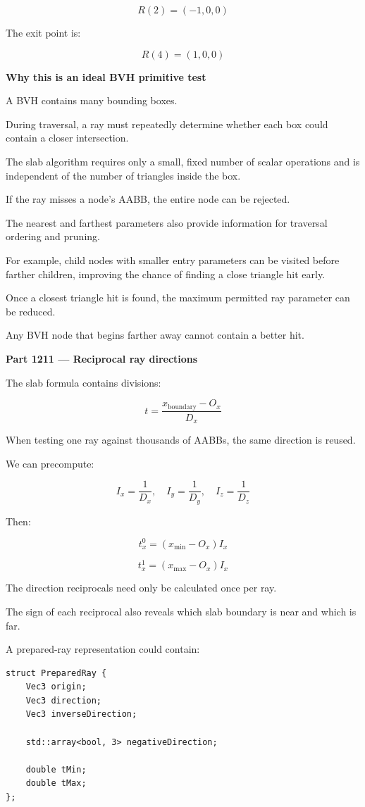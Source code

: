 \[
R(2)=(-1,0,0)
\]

The exit point is:

\[
R(4)=(1,0,0)
\]

\textbf{Why this is an ideal BVH primitive test}

A BVH contains many bounding boxes.

During traversal, a ray must repeatedly determine whether each box could contain a closer intersection.

The slab algorithm requires only a small, fixed number of scalar operations and is independent of the number of triangles inside the box.

If the ray misses a node's AABB, the entire node can be rejected.

The nearest and farthest parameters also provide information for traversal ordering and pruning.

For example, child nodes with smaller entry parameters can be visited before farther children, improving the chance of finding a close triangle hit early.

Once a closest triangle hit is found, the maximum permitted ray parameter can be reduced.

Any BVH node that begins farther away cannot contain a better hit.

\textbf{Part 1211 --- Reciprocal ray directions}

The slab formula contains divisions:

\[
t=\frac{x_{\mathrm{boundary}}-O_x}{D_x}
\]

When testing one ray against thousands of AABBs, the same direction is reused.

We can precompute:

\[
\boxed{ I_x=\frac1{D_x},\quad I_y=\frac1{D_y},\quad I_z=\frac1{D_z} }
\]

Then:

\[
t_x^0=(x_{\min}-O_x)I_x
\]

\[
t_x^1=(x_{\max}-O_x)I_x
\]

The direction reciprocals need only be calculated once per ray.

The sign of each reciprocal also reveals which slab boundary is near and which is far.

A prepared-ray representation could contain:

\begin{verbatim}
struct PreparedRay {
    Vec3 origin;
    Vec3 direction;
    Vec3 inverseDirection;

    std::array<bool, 3> negativeDirection;

    double tMin;
    double tMax;
};
\end{verbatim}

